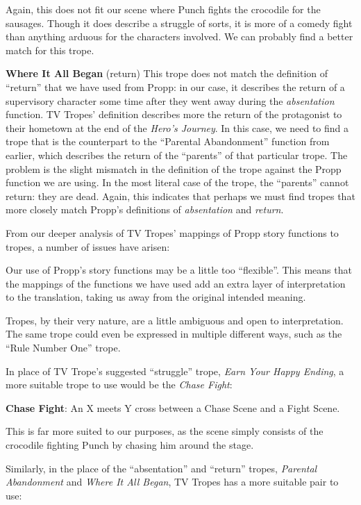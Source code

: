 Again, this does not fit our scene where Punch fights the crocodile for the
sausages. Though it does describe a struggle of sorts, it is more of a comedy
fight than anything arduous for the characters involved. We can probably find a
better match for this trope.

\textbf{Where It All Began} (return)
This trope does not match the definition of ``return'' that we have used from
Propp: in our case, it describes the return of a supervisory character some time
after they went away during the \emph{absentation} function. TV Tropes'
definition describes more the return of the protagonist to their hometown at the
end of the \emph{Hero's Journey}. In this case, we need to find a trope that
is the counterpart to the ``Parental Abandonment'' function from earlier, which
describes the return of the ``parents'' of that particular trope. The problem is
the slight mismatch in the definition of the trope against the Propp function we
are using. In the most literal case of the trope, the ``parents'' cannot return:
they are dead. Again, this indicates that perhaps we must find tropes
that more closely match Propp's definitions of \emph{absentation} and \emph{return}.

From our deeper analysis of TV Tropes' mappings of Propp story functions to
tropes, a number of issues have arisen:

\begin{compactitem}
  \item Our use of Propp's story functions may be a little too ``flexible''.
    This means that the mappings of the functions we have used add an extra
    layer of interpretation to the translation, taking us away from the original
    intended meaning.
  \item Tropes, by their very nature, are a little ambiguous and open to
    interpretation. The same trope could even be expressed in multiple different
    ways, such as the ``Rule Number One'' trope.
\end{compactitem}

In place of TV Trope's suggested ``struggle'' trope, \emph{Earn Your Happy
  Ending}, a more suitable trope to use would be the \emph{Chase Fight}:

\textbf{Chase Fight}: An X meets Y cross between a Chase Scene and a Fight Scene.

This is far more suited to our purposes, as the scene simply consists of the
crocodile fighting Punch by chasing him around the stage.

Similarly, in the place of the ``absentation'' and ``return'' tropes,
\emph{Parental Abandonment} and \emph{Where It All Began}, TV Tropes has a more
suitable pair to use:

